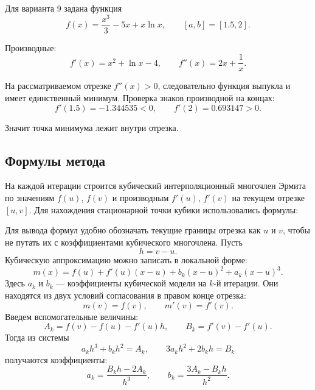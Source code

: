 \documentclass[12pt,a4paper]{article}
\begin{document}
Для варианта 9 задана функция
\begin{equation}
  f(x) = \frac{x^3}{3} - 5x + x\ln x, \qquad [a,b]=[1.5,2].
\end{equation}

Производные:
\begin{equation}
  f'(x)=x^2+\ln x-4, \qquad f''(x)=2x+\frac{1}{x}.
\end{equation}

На рассматриваемом отрезке $f''(x)>0$, следовательно функция выпукла и имеет единственный минимум. Проверка знаков производной на концах:
\begin{equation}
  f'(1.5)=-1.344535 < 0, \qquad f'(2)=0.693147 > 0.
\end{equation}

Значит точка минимума лежит внутри отрезка.

\subsection{Формулы метода}

На каждой итерации строится кубический интерполяционный многочлен Эрмита по значениям $f(u)$, $f(v)$ и производным $f'(u)$, $f'(v)$ на текущем отрезке $[u,v]$. Для нахождения стационарной точки кубики использовались формулы:

Для вывода формул удобно обозначать текущие границы отрезка как $u$ и $v$, чтобы не путать их с коэффициентами кубического многочлена. Пусть
\begin{equation}
  h=v-u.
\end{equation}
Кубическую аппроксимацию можно записать в локальной форме:
\begin{equation}
  m(x)=f(u)+f'(u)(x-u)+b_k(x-u)^2+a_k(x-u)^3.
\end{equation}
Здесь $a_k$ и $b_k$ --- коэффициенты кубической модели на $k$-й итерации. Они находятся из двух условий согласования в правом конце отрезка:
\begin{equation}
  m(v)=f(v), \qquad m'(v)=f'(v).
\end{equation}
Введем вспомогательные величины:
\begin{equation}
  A_k=f(v)-f(u)-f'(u)h, \qquad B_k=f'(v)-f'(u).
\end{equation}
Тогда из системы
\begin{equation}
  a_kh^3+b_kh^2=A_k, \qquad 3a_kh^2+2b_kh=B_k
\end{equation}
получаются коэффициенты:
\begin{equation}
  a_k=\frac{B_kh-2A_k}{h^3}, \qquad
  b_k=\frac{3A_k-B_kh}{h^2}.
\end{equation}
\end{document}
